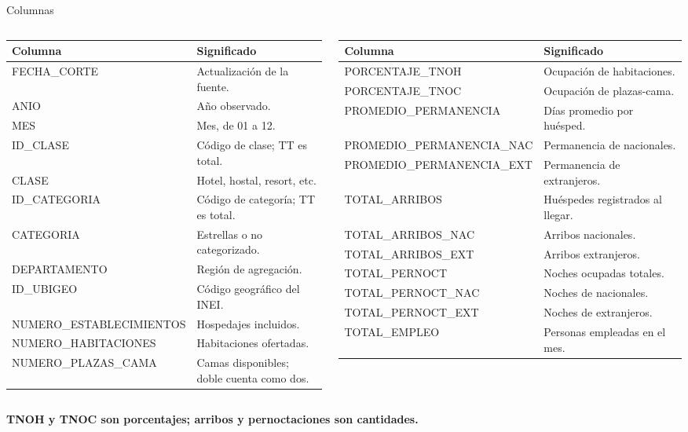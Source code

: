 \documentclass{beamer}
\begin{document}
\begin{frame}{Columnas}
\tiny
\renewcommand{\arraystretch}{1.08}
\begin{columns}[T,onlytextwidth]
\begin{tabularx}{\linewidth}{@{}>{\ttfamily}p{0.47\linewidth} X@{}}
\toprule
\normalfont\textbf{Columna} & \textbf{Significado} \\
\midrule
FECHA\_CORTE & Actualización de la fuente. \\
ANIO & Año observado. \\
MES & Mes, de 01 a 12. \\
ID\_CLASE & Código de clase; TT es total. \\
CLASE & Hotel, hostal, resort, etc. \\
ID\_CATEGORIA & Código de categoría; TT es total. \\
CATEGORIA & Estrellas o no categorizado. \\
DEPARTAMENTO & Región de agregación. \\
ID\_UBIGEO & Código geográfico del INEI. \\
NUMERO\_ESTABLECIMIENTOS & Hospedajes incluidos. \\
NUMERO\_HABITACIONES & Habitaciones ofertadas. \\
NUMERO\_PLAZAS\_CAMA & Camas disponibles; doble cuenta como dos. \\
\bottomrule
\end{tabularx}

\begin{tabularx}{\linewidth}{@{}>{\ttfamily}p{0.51\linewidth} X@{}}
\toprule
\normalfont\textbf{Columna} & \textbf{Significado} \\
\midrule
PORCENTAJE\_TNOH & Ocupación de habitaciones. \\
PORCENTAJE\_TNOC & Ocupación de plazas-cama. \\
PROMEDIO\_PERMANENCIA & Días promedio por huésped. \\
PROMEDIO\_PERMANENCIA\_NAC & Permanencia de nacionales. \\
PROMEDIO\_PERMANENCIA\_EXT & Permanencia de extranjeros. \\
TOTAL\_ARRIBOS & Huéspedes registrados al llegar. \\
TOTAL\_ARRIBOS\_NAC & Arribos nacionales. \\
TOTAL\_ARRIBOS\_EXT & Arribos extranjeros. \\
TOTAL\_PERNOCT & Noches ocupadas totales. \\
TOTAL\_PERNOCT\_NAC & Noches de nacionales. \\
TOTAL\_PERNOCT\_EXT & Noches de extranjeros. \\
TOTAL\_EMPLEO & Personas empleadas en el mes. \\
\bottomrule
\end{tabularx}
\end{columns}
\vspace{0.4em}
\centering
\textbf{TNOH y TNOC son porcentajes; arribos y pernoctaciones son cantidades.}
\end{frame}
\end{document}
